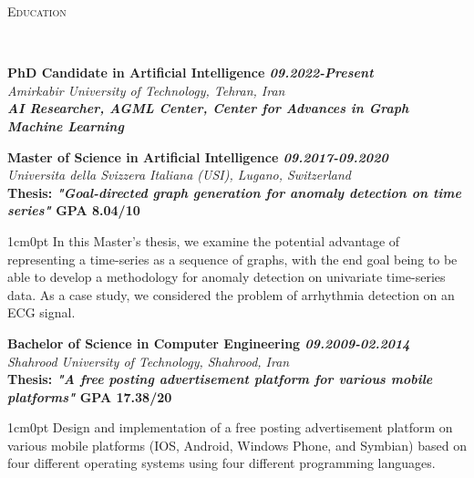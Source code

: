 \documentclass[9pt]{article}
\newenvironment{changemargin}[2]{%
  \begin{list}{}{%
    \setlength{\topsep}{0pt}%
    \setlength{\leftmargin}{#1}%
    \setlength{\rightmargin}{#2}%
    \setlength{\listparindent}{\parindent}%
    \setlength{\itemindent}{\parindent}%
    \setlength{\parsep}{\parskip}%
  }%
  \item[]}{\end{list}
}
\newcommand{\lineover}{
	\begin{changemargin}{-0.05in}{-0.05in}
		\vspace*{-8pt}
		\hrulefill \\
		\vspace*{-2pt}
	\end{changemargin}
}
\newcommand{\header}[1]{
	\begin{changemargin}{-0.5in}{-0.5in}
		\scshape{#1}\\
  	\lineover
	\end{changemargin}
}
\newenvironment{body} {
	\vspace*{-16pt}
	\begin{changemargin}{-0.25in}{-0.5in}
  }	
	{\end{changemargin}
}
\begin{document}
\header{Education}
\begin{body}
	\vspace{14pt}
	\textbf{PhD Candidate in Artificial Intelligence  \hfill \emph{09.2022-Present}} \\
	\emph{Amirkabir University of Technology, Tehran, Iran}\\
	\hspace{0.5cm}\textbf{\emph{AI Researcher, AGML Center, Center for Advances in Graph Machine Learning}}\\
\end{body}
\begin{body}
	\vspace{14pt}
	\textbf{Master of Science in Artificial Intelligence  \hfill \emph{09.2017-09.2020}} \\
	\emph{Universita della Svizzera Italiana (USI), Lugano, Switzerland}\\
	\hspace{0.5cm}\textbf{Thesis: \emph{"Goal-directed graph generation for anomaly detection on time series"} GPA 8.04/10}\\
	\begin{adjustwidth}{1cm}{0pt}
		{In this Master’s thesis, we examine the potential advantage of representing a time-series as a sequence of graphs, with the end goal being to be able to develop a methodology for anomaly detection on univariate time-series data. As a case study, we considered the problem of arrhythmia detection on an ECG signal.}
	\end{adjustwidth}
\end{body}
\vspace{5pt}
\begin{body}
	\vspace{14pt}
	\textbf{Bachelor of Science in Computer Engineering  \hfill \emph{09.2009-02.2014}} \\
	\emph{Shahrood University of Technology, Shahrood, Iran}\\
	\hspace{0.5cm} \textbf{Thesis: \emph{"A free posting advertisement platform for various mobile platforms"} GPA 17.38/20}\\
	\begin{adjustwidth}{1cm}{0pt}
		{Design and implementation of a free posting advertisement platform on various mobile platforms (IOS, Android, Windows Phone, and Symbian) based on four different operating systems using four different programming languages.}
	\end{adjustwidth}
\end{body}
\vspace{5pt}
\end{document}

